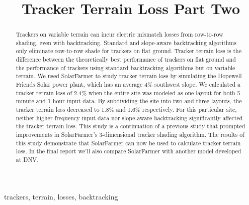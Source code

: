 \documentclass[conference]{IEEEtran}
\begin{document}
\title{Tracker Terrain Loss Part Two}

\author{
	}

\maketitle

\begin{abstract}
Trackers on variable terrain can incur electric mismatch losses from row-to-row shading, even with backtracking. Standard and slope-aware backtracking algorithms only eliminate row-to-row shade for trackers on flat ground. Tracker terrain loss is the difference between the theoretically best performance of trackers on flat ground and the performance of trackers using standard backtracking algorithms but on variable terrain. We used SolarFarmer to study tracker terrain loss by simulating the Hopewell Friends Solar power plant, which has an average 4\% southwest slope. We calculated a tracker terrain loss of 2.4\% when the entire site was modeled as one layout for both 5-minute and 1-hour input data. By subdividing the site into two and three layouts, the tracker terrain loss decreased to 1.8\% and 1.6\% respectively. For this particular site, neither higher frequency input data nor slope-aware backtracking significantly affected the tracker terrain loss. This study is a continuation of a previous study that prompted improvements in SolarFarmer's 3-dimensional tracker shading algorithm. The results of this study demonstrate that SolarFarmer can now be used to calculate tracker terrain loss. In the final report we'll also compare SolarFarmer with another model developed at DNV.
\end{abstract}

\begin{IEEEkeywords}
trackers, terrain, losses, backtracking
\end{IEEEkeywords}
\end{document}
